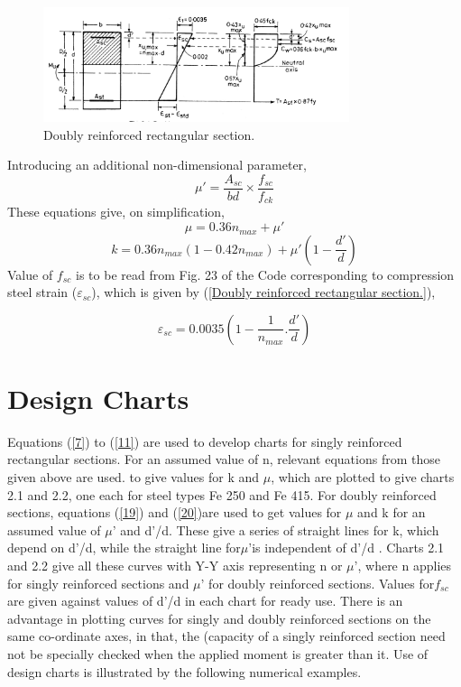 \begin{figure}
\centering
\includegraphics[width=0.8\textwidth]{images/ch2-4.png}
\caption{Doubly reinforced rectangular section.}
\label{reinforced section}
\end{figure}
Introducing an additional non-dimensional parameter,
\begin{equation*}
\mu' = \frac{A_{sc}}{bd} \times \frac{f_{sc}}{f_{ck}}
\label{18}
\end{equation*}
These equations give, on simplification,
\begin{equation}
\mu=0.36n_{max} + \mu'
\label{19}
\end{equation}
\newpage
\begin{equation}
k=0.36n_{max}(1-0.42n_{max}) + \mu'(1-\frac{d'}{d})
\label{20}
\end{equation}
Value of ${f_{sc}}$ is to be read from Fig. 23 of the Code corresponding to compression steel strain
($\varepsilon_{sc}$), which is given by (\fig \ref{Doubly reinforced rectangular section.}),

\begin{equation}
\varepsilon_{sc} = 0.0035(1-\frac{1}{n_{max}}.\frac{d'}{d})
\label{21}
\end{equation}
\section{Design Charts}
Equations (\eqn \ref{7}) to (\eqn \ref{11}) are used to develop charts for singly reinforced rectangular
sections. For an assumed value of n, relevant equations from those given above are used. to
give values for k and ${\mu}$, which are plotted to give charts 2.1 and 2.2, one each for steel types
Fe 250 and Fe 415. For doubly reinforced sections, equations (\eqn \ref{19}) and (\eqn \ref{20})are used to get
values for ${\mu}$ and k for an assumed value of ${\mu’}$ and d'/d. These give a series of straight lines for
k, which depend on d'/d, while the straight line for${\mu’}$is independent of d'/d . Charts 2.1 and 2.2
give all these curves with Y-Y axis representing n or ${\mu’}$, where n applies for singly reinforced
sections and ${\mu’}$ for doubly reinforced sections. Values for${f_{sc}}$ are given against values of d'/d in
each chart for ready use. There is an advantage in plotting curves for singly and doubly
reinforced sections on the same co-ordinate axes, in that, the (capacity of a singly reinforced
section need not be specially checked when the applied moment is greater than it. Use of design
charts is illustrated by the following numerical examples.
